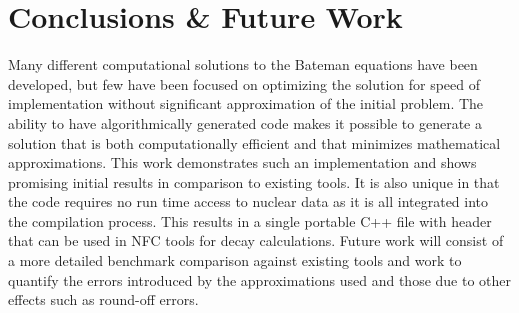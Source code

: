 \documentclass{anstrans}
\begin{document}
\section{Conclusions \& Future Work}

Many different computational solutions to the Bateman equations have been 
developed, but few have been focused on optimizing the solution for speed
of implementation without significant approximation of the initial problem.
 The ability to have algorithmically 
generated code makes it possible to generate a solution that is both 
computationally efficient and that minimizes mathematical approximations. This 
work demonstrates such an implementation and shows promising initial results
in comparison to existing tools. It is also unique in that the code requires no
run time access to nuclear data as it is all integrated into the compilation 
process. This results in a single portable C++ file with header that can be 
used in NFC tools for decay calculations. Future work will consist of a more 
detailed benchmark
comparison against existing tools and work to quantify the errors introduced by
the approximations used and those due to other effects such as round-off errors. 




\end{document}
